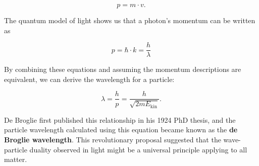 \documentclass[
  a4paper,
]{book}
\begin{document}
\[
p = m \cdot v \mathrm{.}
\]

The quantum model of light shows us that a photon's momentum can be
written as

\[
p = \hbar \cdot k = \frac{h}{\lambda}
\]

By combining these equations and assuming the momentum descriptions are
equivalent, we can derive the wavelength for a particle:

\[
\lambda = \frac{h}{p} = \frac{h}{\sqrt{2 m E_{\mathrm{kin}}}} \mathrm{.}
\]

De Broglie first published this relationship in his 1924 PhD thesis, and
the particle wavelength calculated using this equation became known as
the \textbf{de Broglie wavelength}. This revolutionary proposal
suggested that the wave-particle duality observed in light might be a
universal principle applying to all matter.
\end{document}
